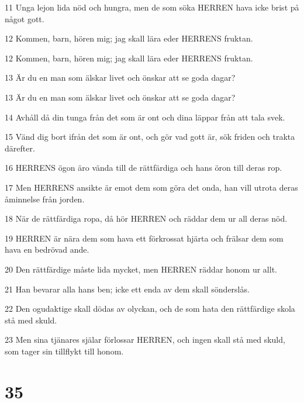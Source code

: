 \par 11 Unga lejon lida nöd och hungra, men de som söka HERREN hava icke brist på något gott.
\par 12 Kommen, barn, hören mig; jag skall lära eder HERRENS fruktan.
\par 12 Kommen, barn, hören mig; jag skall lära eder HERRENS fruktan.
\par 13 Är du en man som älskar livet och önskar att se goda dagar?
\par 13 Är du en man som älskar livet och önskar att se goda dagar?
\par 14 Avhåll då din tunga från det som är ont och dina läppar från att tala svek.
\par 15 Vänd dig bort ifrån det som är ont, och gör vad gott är, sök friden och trakta därefter.
\par 16 HERRENS ögon äro vända till de rättfärdiga och hans öron till deras rop.
\par 17 Men HERRENS ansikte är emot dem som göra det onda, han vill utrota deras åminnelse från jorden.
\par 18 När de rättfärdiga ropa, då hör HERREN och räddar dem ur all deras nöd.
\par 19 HERREN är nära dem som hava ett förkrossat hjärta och frälsar dem som hava en bedrövad ande.
\par 20 Den rättfärdige måste lida mycket, men HERREN räddar honom ur allt.
\par 21 Han bevarar alla hans ben; icke ett enda av dem skall sönderslås.
\par 22 Den ogudaktige skall dödas av olyckan, och de som hata den rättfärdige skola stå med skuld.
\par 23 Men sina tjänares själar förlossar HERREN, och ingen skall stå med skuld, som tager sin tillflykt till honom.

\chapter{35}

